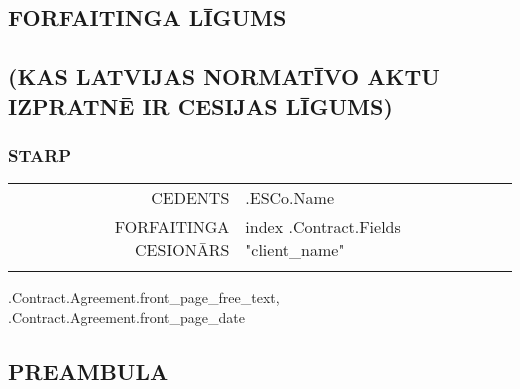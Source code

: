 \documentclass[a4paper]{article}
\begin{document}
\renewcommand\thesection{}
\renewcommand\thesubsection{}
\renewcommand\thesubsubsection{}

\begin{center}

  \vspace*{\fill}
  \section{FORFAITINGA LĪGUMS}
  \subsection{(KAS LATVIJAS NORMATĪVO AKTU IZPRATNĒ IR CESIJAS LĪGUMS)}
  \vspace*{\fill}

  \vspace{8cm}

  \subsubsection{STARP}

  \vspace{1cm}

  \begin{tabu}{|r|X[2]|} \tabucline{}

    CEDENTS&{{.ESCo.Name}}\\\tabucline{}

    FORFAITINGA CESIONĀRS&{{index .Contract.Fields "client_name"}}\\\tabucline{}

  \end{tabu}

  \iffalse input forfaitingFields.front_page_free_text value="{{.Contract.Agreement.front_page_free_text}}" \fi {{.Contract.Agreement.front_page_free_text}}, \iffalse input forfaitingFields.front_page_date value="{{.Contract.Agreement.front_page_date}}" type="date" \fi {{.Contract.Agreement.front_page_date}}

\end{center}

\pagebreak

\begin{center}
	\section{PREAMBULA}
\end{center}

\vspace{5mm}
\end{document}
